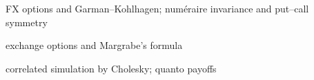 \begin{planned}
  \item FX options and Garman--Kohlhagen; num\'eraire invariance and put--call symmetry
  \item exchange options and Margrabe's formula
  \item correlated simulation by Cholesky; quanto payoffs
\end{planned}
